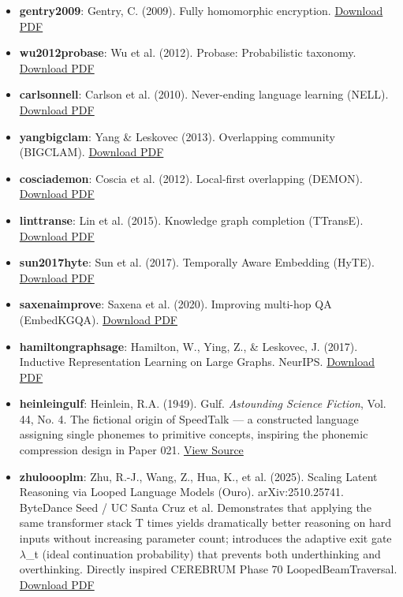 \begin{itemize}
\item \textbf{gentry2009}: Gentry, C. (2009). Fully homomorphic encryption. \href{https://crypto.stanford.edu/craig/craig-thesis.pdf}{Download PDF}
\item \textbf{wu2012probase}: Wu et al. (2012). Probase: Probab\-ilistic taxonomy. \href{https://www.cs.uwyo.edu/~ruben/cs5011/probase.pdf}{Download PDF}
\item \textbf{carlson\-nell}: Carlson et al. (2010). Never-ending language learning (NELL). \href{http://www.cs.cmu.edu/~acarlson/papers/carlson-aaai10.pdf}{Download PDF}
\item \textbf{yang\-bigclam}: Yang \& Leskovec (2013). Overlapping community (BIGCLAM). \href{https://arxiv.org/pdf/1205.6228.pdf}{Download PDF}
\item \textbf{coscia\-demon}: Coscia et al. (2012). Local-first overlapping (DEMON). \href{https://arxiv.org/pdf/1206.0629.pdf}{Download PDF}
\item \textbf{lin\-ttranse}: Lin et al. (2015). Knowledge graph completion (TTransE). \href{https://thunlp.org/~lzy/publications/aaai2015_transr.pdf}{Download PDF}
\item \textbf{sun2017hyte}: Sun et al. (2017). Temporally Aware Embedding (HyTE). \href{https://www.researchgate.net/profile/Shibiao_Sun/publication/320448102_Hyte_Joint_embedding_of_entities_relations_and_time/links/5a9e59d9a6fdcc546ad881f3/Hyte-Joint-embedding-of-entities-relations-and-time.pdf}{Download PDF}
\item \textbf{saxena\-improve}: Saxena et al. (2020). Improving multi-hop QA (EmbedKGQA). \href{https://arxiv.org/pdf/1909.11855.pdf}{Download PDF}
\item \textbf{hamilton\-graphsage}: Hamilton, W., Ying, Z., \& Leskovec, J. (2017). Inductive Repres\-entation Learning on Large Graphs. NeurIPS. \href{https://arxiv.org/pdf/1706.02216.pdf}{Download PDF}
\item \textbf{heinlein\-gulf}: Heinlein, R.A. (1949). Gulf. \textit{Astounding Science Fiction}, Vol. 44, No. 4. The fictional origin of SpeedTalk — a constructed language assigning single phonemes to primitive concepts, inspiring the phonemic compression design in Paper 021. \href{https://archive.org/details/Astounding_v44n04_1949-12}{View Source}
\item \textbf{zhu\-loooplm}: Zhu, R.-J., Wang, Z., Hua, K., et al. (2025). Scaling Latent Reasoning via Looped Language Models (Ouro). arXiv:2510.25741. ByteDance Seed / UC Santa Cruz et al. Demons\-trates that applying the same transformer stack T times yields drama\-tically better reasoning on hard inputs without increasing parameter count; introduces the adaptive exit gate $\lambda$\_t (ideal conti\-nuation probability) that prevents both under\-thinking and overt\-hinking. Directly inspired CEREBRUM Phase 70 LoopedBeamTraversal. \href{https://arxiv.org/pdf/2510.25741}{Download PDF}

\end{itemize}
